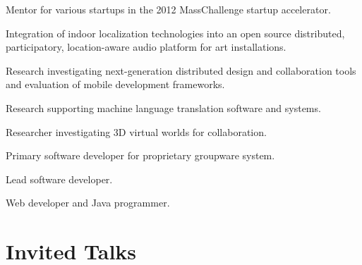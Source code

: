 \documentclass[line]{res}
\begin{document}
\begin{resume}
	\begin{position}
		Mentor for various startups in the 2012 MassChallenge startup accelerator.
	\end{position}
	
	\begin{position}
		Integration of indoor localization technologies into an open source distributed, participatory, location-aware audio platform for art installations.
	\end{position}
	
	\begin{position}
		Research investigating next-generation distributed design and collaboration tools and evaluation of mobile development frameworks.
	\end{position}
	
	\begin{position}
		Research supporting machine language translation software and systems. 
	\end{position}
	
	\begin{position}
		Researcher investigating 3D virtual worlds for collaboration. 
	\end{position}
	
	\begin{position}
		Primary software developer for proprietary groupware system. 
	\end{position}
	
	\begin{position}
		Lead software developer. 
	\end{position}
	
	\begin{position}
		Web developer and Java programmer. 
	\end{position}
	
	
	\section{\sc Invited Talks}


\end{resume}
\end{document}
